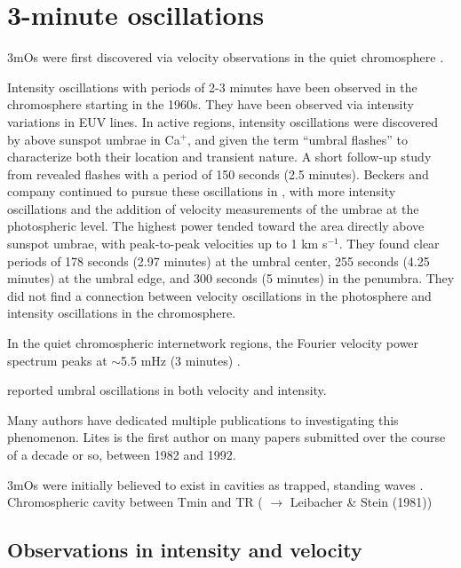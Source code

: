 \section{3-minute oscillations}


3mOs were
first discovered via velocity observations in the quiet chromosphere
\citep{Jensen1963}.

Intensity oscillations with periods of 2-3 minutes have been observed in
the chromosphere starting in the 1960s.
They have been observed
via intensity variations in EUV lines.
In active regions, intensity oscillations were discovered by
\cite{Beckers1969} above sunspot umbrae in Ca$^{+}$,
and given the term ``umbral flashes'' to characterize
both their location and transient nature.
A short follow-up study from \cite{Wittmann1969} revealed
flashes with a period of 150 seconds (2.5 minutes).
Beckers and company continued to pursue these oscillations in
\citep{Beckers1972},
with more intensity oscillations and the addition of velocity measurements
of the umbrae at the photospheric level.
The highest power tended toward the area
directly above sunspot umbrae, with peak-to-peak velocities up to
1 km s$^{-1}$.
They found clear periods of
178 seconds (2.97 minutes) at the umbral center,
255 seconds (4.25 minutes) at the umbral edge, and
300 seconds (5 minutes) in the penumbra.
They did not find a connection between velocity oscillations in the photosphere
and intensity oscillations in the chromosphere.

In the quiet chromospheric internetwork regions,
the Fourier velocity power spectrum peaks at
$\sim$5.5 mHz (3 minutes)
\citep{Orrall1966}.

\cite{Giovanelli1972} reported umbral oscillations in both velocity and intensity.

Many authors have dedicated multiple publications to investigating
this phenomenon. Lites is the first author on many papers submitted
over the course of a decade or so, between 1982 and 1992.


3mOs were initially believed to exist in cavities as
trapped, standing waves
\citep{Scheuer1981}.
Chromospheric cavity between Tmin and TR
(\cite{Chae2015}
$\rightarrow$
Leibacher \& Stein (1981))


\subsection{Observations in intensity and velocity}
